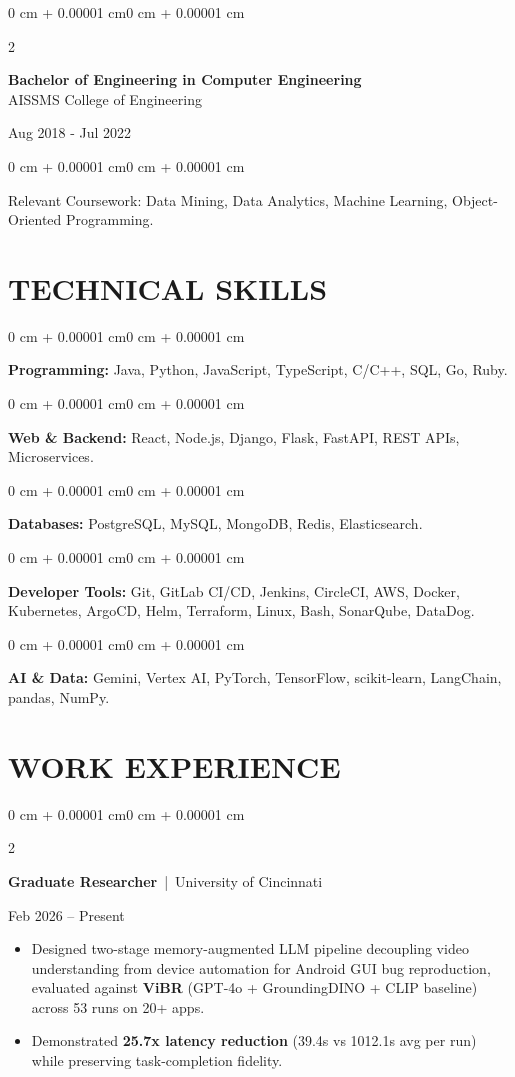 \documentclass[10pt, letterpaper]{article}
\newenvironment{highlights}{
    \begin{itemize}[
        topsep=0.10 cm,
        parsep=0.06 cm,
        partopsep=0pt,
        itemsep=0.06 cm,
        leftmargin=12pt
    ]
}{
    \end{itemize}
}
\newenvironment{onecolentry}{
    \begin{adjustwidth}{0 cm + 0.00001 cm}{0 cm + 0.00001 cm}
}{
    \end{adjustwidth}
}
\newenvironment{twocolentry}[2][]{
    \onecolentry
    \def\secondColumn{#2}
    \setcolumnwidth{\fill, 4.5 cm}
    \begin{paracol}{2}
}{
    \switchcolumn \raggedleft \secondColumn
    \end{paracol}
    \endonecolentry
}
\begin{document}
\begin{twocolentry}{
    Aug 2018 - Jul 2022
}
    \textbf{Bachelor of Engineering in Computer Engineering} \\
    AISSMS College of Engineering
\end{twocolentry}
\begin{onecolentry}
Relevant Coursework: Data Mining, Data Analytics, Machine Learning, Object-Oriented Programming.
\end{onecolentry}
\section{TECHNICAL SKILLS}
\begin{onecolentry}
\textbf{Programming:} Java, Python, JavaScript, TypeScript, C/C++, SQL, Go, Ruby.
\end{onecolentry}
\vspace{0.06 cm}
\begin{onecolentry}
\textbf{Web \& Backend:} React, Node.js, Django, Flask, FastAPI, REST APIs, Microservices.
\end{onecolentry}
\vspace{0.06 cm}
\begin{onecolentry}
\textbf{Databases:} PostgreSQL, MySQL, MongoDB, Redis, Elasticsearch.
\end{onecolentry}
\vspace{0.06 cm}
\begin{onecolentry}
\textbf{Developer Tools:} Git, GitLab CI/CD, Jenkins, CircleCI, AWS, Docker, Kubernetes, ArgoCD, Helm, Terraform, Linux, Bash, SonarQube, DataDog.
\end{onecolentry}
\vspace{0.06 cm}
\begin{onecolentry}
\textbf{AI \& Data:} Gemini, Vertex AI, PyTorch, TensorFlow, scikit-learn, LangChain, pandas, NumPy.
\end{onecolentry}

\section{WORK EXPERIENCE}
\begin{twocolentry}{Feb 2026 -- Present}
\textbf{Graduate Researcher} \,|\, University of Cincinnati
\end{twocolentry}
\begin{highlights}
  \item Designed two-stage memory-augmented LLM pipeline decoupling video understanding from device automation for Android GUI bug reproduction, evaluated against \textbf{ViBR} (GPT-4o + GroundingDINO + CLIP baseline) across 53 runs on 20+ apps.
  \item Demonstrated \textbf{25.7x latency reduction} (39.4s vs 1012.1s avg per run) while preserving task-completion fidelity.
\end{highlights}
\end{document}
